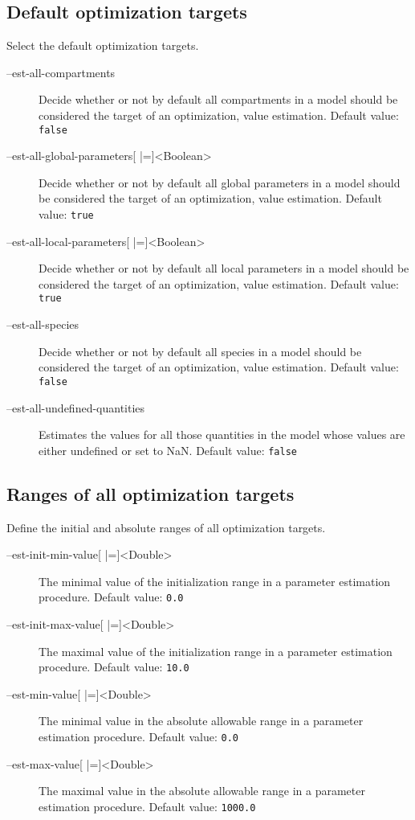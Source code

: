 \subsection{Default optimization targets}
Select the default optimization targets.
\begin{description}
\item[--est-all-compartments]
          Decide whether or not by default all compartments in a model
          should be considered the target of an optimization, \ie value
          estimation.
          Default value: \texttt{false}
\item[--est-all-global-parameters{[} |={]}<Boolean>]
          Decide whether or not by default all global parameters in a model
          should be considered the target of an optimization, \ie value
          estimation.
          Default value: \texttt{true}
\item[--est-all-local-parameters{[} |={]}<Boolean>]
          Decide whether or not by default all local parameters in a model
          should be considered the target of an optimization, \ie value
          estimation.
          Default value: \texttt{true}
\item[--est-all-species]
          Decide whether or not by default all species in a model should
          be considered the target of an optimization, \ie value estimation.
          Default value: \texttt{false}
\item[--est-all-undefined-quantities]
          Estimates the values for all those quantities in the model whose
          values are either undefined or set to \ac{NaN}.
          Default value: \texttt{false}
\end{description}

\subsection{Ranges of all optimization targets}
Define the initial and absolute ranges of all optimization targets.
\begin{description}
\item[--est-init-min-value{[} |={]}<Double>]
          The minimal value of the initialization range in a parameter estimation procedure.
          Default value: \texttt{0.0}
\item[--est-init-max-value{[} |={]}<Double>]
          The maximal value of the initialization range in a parameter
          estimation procedure.
          Default value: \texttt{10.0}
\item[--est-min-value{[} |={]}<Double>]
          The minimal value in the absolute allowable range in a parameter
          estimation procedure.
          Default value: \texttt{0.0}
\item[--est-max-value{[} |={]}<Double>]
          The maximal value in the absolute allowable range in a parameter
          estimation procedure.
          Default value: \texttt{1000.0}
\end{description}

